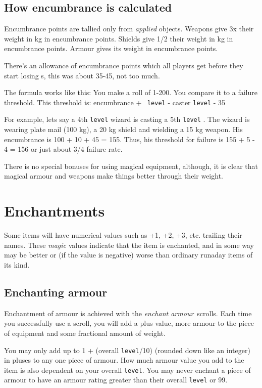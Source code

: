 \subsection{How encumbrance is calculated}
Encumbrance points are tallied only from {\em applied} objects. Weapons 
give
3x their weight in kg in encumbrance points. Shields give 1/2 their weight
in kg in encumbrance points. Armour gives its weight in encumbrance points.
 
There's an allowance of encumbrance points which all players get before they
start losing \incantation s, this was about 35-45, not too much.
 
The formula works like this: You make a roll of 1-200. You compare it to a
failure threshold. This threshold is: encumbrance + \incantation\ {\tt level}
 - caster {\tt level} - 35
 
For example, lets say a 4th {\tt level} wizard is casting a 5th {\tt level} 
\incantation . The wizard is wearing plate mail (100 kg), a 20 kg shield and 
wielding a 15 kg weapon. His encumbrance is 100 + 10 + 45 = 155. Thus, his
threshold for failure is 155 + 5 - 4 = 156 or just about 3/4 failure rate.
 
There is no special bonuses for using magical equipment, although, it is
clear that magical armour and weapons make things better through their weight. 

\section{Enchantments}\label{sec:enchant}
 
Some items will have numerical values such as +1, +2, +3, etc.
trailing their names. These {\em magic} values indicate that the item 
is enchanted,
and in some way may be better or (if the value is negative) worse
than ordinary runaday items of its kind.
 
\subsection{Enchanting armour} 

Enchantment of armour is achieved with the 
{\em enchant armour}\ scrolls. 
Each time you successfully use a scroll, you will
add a plus value, more armour to the piece of equipment and
some fractional amount of weight.

You may only add up to 1 + (overall {\tt level}/10) (rounded down like an
integer) in pluses to any one piece of armour. How much 
armour value you add to the item is also dependent on your
overall {\tt level}. You may never enchant a piece of armour to 
have an armour rating greater than their overall {\tt level} or 99.
  
